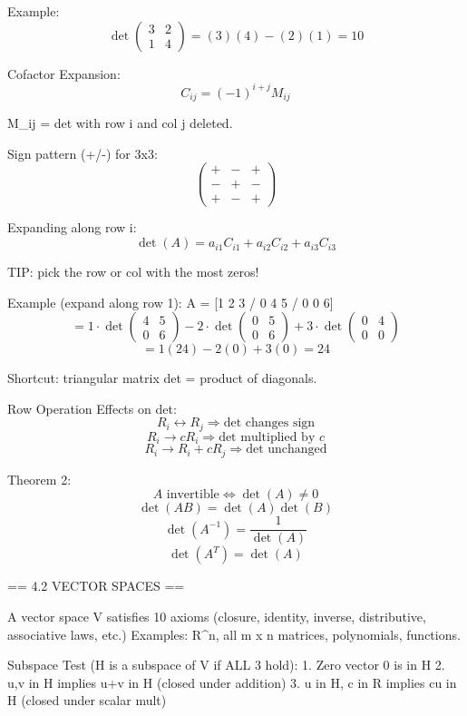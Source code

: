 Example:
$$\det\begin{pmatrix}3 & 2 \\ 1 & 4\end{pmatrix} = (3)(4)-(2)(1) = 10$$

Cofactor Expansion:
$$C_{ij} = (-1)^{i+j} M_{ij}$$

M_ij = det with row i and col j deleted.

Sign pattern (+/-) for 3x3:
$$\begin{pmatrix}+ & - & + \\ - & + & - \\ + & - & +\end{pmatrix}$$

Expanding along row i:
$$\det(A) = a_{i1}C_{i1} + a_{i2}C_{i2} + a_{i3}C_{i3}$$

TIP: pick the row or col with the most zeros!

Example (expand along row 1):
A = [1 2 3 / 0 4 5 / 0 0 6]
$$= 1\cdot\det\begin{pmatrix}4&5\\0&6\end{pmatrix} - 2\cdot\det\begin{pmatrix}0&5\\0&6\end{pmatrix} + 3\cdot\det\begin{pmatrix}0&4\\0&0\end{pmatrix}$$
$$= 1(24) - 2(0) + 3(0) = 24$$

Shortcut: triangular matrix det = product of diagonals.

Row Operation Effects on det:
$$R_i \leftrightarrow R_j \Rightarrow \text{det changes sign}$$
$$R_i \to cR_i \Rightarrow \text{det multiplied by } c$$
$$R_i \to R_i + cR_j \Rightarrow \text{det unchanged}$$

Theorem 2:
$$A \text{ invertible} \Leftrightarrow \det(A) \neq 0$$
$$\det(AB) = \det(A)\det(B)$$
$$\det(A^{-1}) = \frac{1}{\det(A)}$$
$$\det(A^T) = \det(A)$$


== 4.2 VECTOR SPACES ==

A vector space V satisfies 10 axioms (closure, identity,
inverse, distributive, associative laws, etc.)
Examples: R^n, all m x n matrices, polynomials, functions.

Subspace Test (H is a subspace of V if ALL 3 hold):
1. Zero vector 0 is in H
2. u,v in H implies u+v in H (closed under addition)
3. u in H, c in R implies cu in H (closed under scalar mult)


